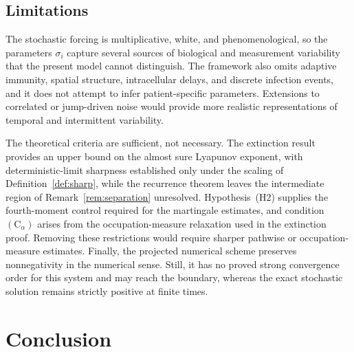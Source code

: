 \documentclass{article}
\begin{document}
\subsection*{Limitations}

The stochastic forcing is multiplicative, white, and phenomenological, so the parameters $\sigma_i$ capture several sources of biological and measurement variability that the present model cannot distinguish. The framework also omits adaptive immunity, spatial structure, intracellular delays, and discrete infection events, and it does not attempt to infer patient-specific parameters. Extensions to correlated or jump-driven noise would provide more realistic representations of temporal and intermittent variability.

The theoretical criteria are sufficient, not necessary. The extinction result provides an upper bound on the almost sure Lyapunov exponent, with deterministic-limit sharpness established only under the scaling of Definition~\ref{def:sharp}, while the recurrence theorem leaves the intermediate region of Remark~\ref{rem:separation} unresolved. Hypothesis~(H2) supplies the fourth-moment control required for the martingale estimates, and condition $(\mathrm{C}_\alpha)$ arises from the occupation-measure relaxation used in the extinction proof. Removing these restrictions would require sharper pathwise or occupation-measure estimates. Finally, the projected numerical scheme preserves nonnegativity in the numerical sense. Still, it has no proved strong convergence order for this system and may reach the boundary, whereas the exact stochastic solution remains strictly positive at finite times.
\section{Conclusion}\label{sec:conclusion}
\end{document}
